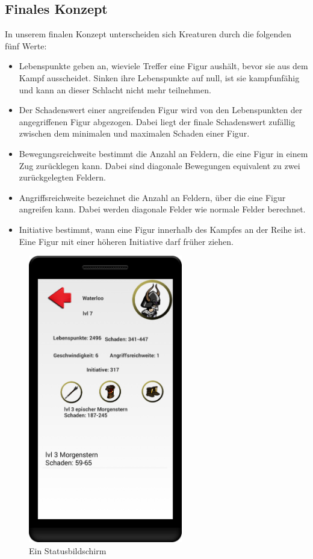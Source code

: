 \documentclass[extern,palatino]{cgBA}
\begin{document}
\subsection{Finales Konzept}
In unserem finalen Konzept unterscheiden sich Kreaturen durch die folgenden fünf Werte: \begin{itemize}
	\item Lebenspunkte geben an, wieviele Treffer eine Figur aushält, bevor sie aus dem Kampf ausscheidet. Sinken ihre Lebenspunkte auf null, ist sie kampfunfähig und kann an dieser Schlacht nicht mehr teilnehmen.
	\item Der Schadenswert einer angreifenden Figur wird von den Lebenspunkten der angegriffenen Figur abgezogen. Dabei liegt der finale Schadenswert zufällig zwischen dem minimalen und maximalen Schaden einer Figur.
	\item Bewegungsreichweite bestimmt die Anzahl an Feldern, die eine Figur in einem Zug zurücklegen kann. Dabei sind diagonale Bewegungen equivalent zu zwei zurückgelegten Feldern.
	\item Angriffsreichweite bezeichnet die Anzahl an Feldern, über die eine Figur angreifen kann. Dabei werden diagonale Felder wie normale Felder berechnet.
	\item Initiative bestimmt, wann eine Figur innerhalb des Kampfes an der Reihe ist. Eine Figur mit einer höheren Initiative darf früher ziehen.
\end{itemize}
\begin{figure}[H] 
	\centering
	\includegraphics[width=0.6\textwidth]{statscreen.png}
	\caption{Ein Statusbildschirm}
\end{figure} 
\end{document}
